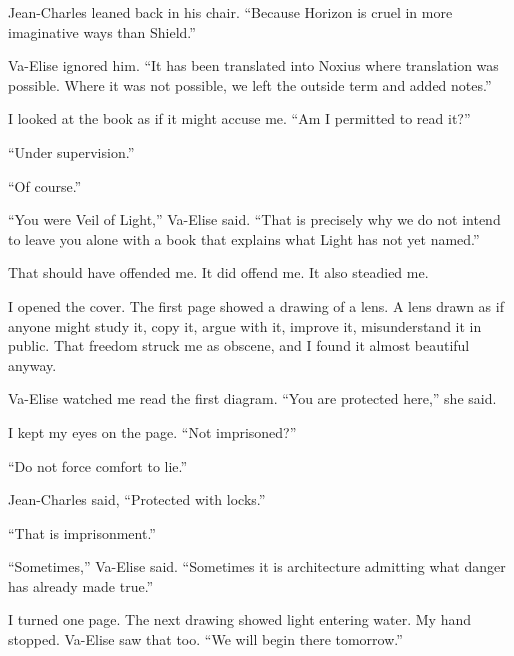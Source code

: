 Jean-Charles leaned back in his chair. ``Because Horizon is cruel in more imaginative ways than Shield.''\par

Va-Elise ignored him. ``It has been translated into Noxius where translation was possible. Where it was not possible, we left the outside term and added notes.''\par

I looked at the book as if it might accuse me. ``Am I permitted to read it?''\par

``Under supervision.''\par

``Of course.''\par

``You were Veil of Light,'' Va-Elise said. ``That is precisely why we do not intend to leave you alone with a book that explains what Light has not yet named.''\par

That should have offended me. It did offend me. It also steadied me.\par

I opened the cover. The first page showed a drawing of a lens. A lens drawn as if anyone might study it, copy it, argue with it, improve it, misunderstand it in public. That freedom struck me as obscene, and I found it almost beautiful anyway.\par

Va-Elise watched me read the first diagram. ``You are protected here,'' she said.\par

I kept my eyes on the page. ``Not imprisoned?''\par

``Do not force comfort to lie.''\par

Jean-Charles said, ``Protected with locks.''\par

``That is imprisonment.''\par

``Sometimes,'' Va-Elise said. ``Sometimes it is architecture admitting what danger has already made true.''\par

I turned one page. The next drawing showed light entering water. My hand stopped. Va-Elise saw that too. ``We will begin there tomorrow.''\par

